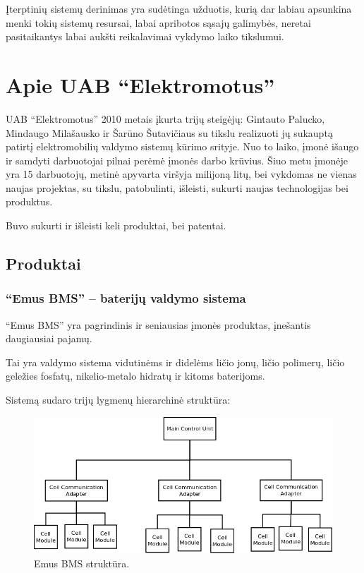 \documentclass[12pt, a4paper, lithuanian, final]{article}
\begin{document}
Įterptinių sistemų derinimas yra sudėtinga užduotis, kurią dar labiau apsunkina menki tokių sistemų resursai, labai apribotos sąsajų galimybės, neretai pasitaikantys labai aukšti reikalavimai vykdymo laiko tikslumui.











\section{Apie UAB "`Elektromotus"'}

UAB "`Elektromotus"' 2010 metais įkurta trijų steigėjų: Gintauto Palucko, Mindaugo Milašausko ir Šarūno Šutavičiaus su tikslu realizuoti jų sukauptą patirtį elektromobilių valdymo sistemų kūrimo srityje.
Nuo to laiko, įmonė išaugo ir samdyti darbuotojai pilnai perėmė įmonės darbo krūvius.
Šiuo metu įmonėje yra 15 darbuotojų, metinė apyvarta viršyja milijoną litų, bei vykdomas ne vienas naujas projektas, su tikslu, patobulinti, išleisti, sukurti naujas technologijas bei produktus.

Buvo sukurti ir išleisti keli produktai, bei patentai.


\subsection{Produktai}
\subsubsection{"`Emus BMS"' -- baterijų valdymo sistema}
"`Emus BMS"' yra pagrindinis ir seniausias įmonės produktas, įnešantis daugiausiai pajamų.

Tai yra valdymo sistema vidutinėms ir didelėms ličio jonų, ličio polimerų, ličio geležies fosfatų, nikelio-metalo hidratų ir kitoms baterijoms.

Sistemą sudaro trijų lygmenų hierarchinė struktūra:

\begin{figure}[H]
\begin{center}
\includegraphics[width=1\textwidth]{img/bms_desc.png}
\caption{Emus BMS struktūra.}
\end{center}
\end{figure}
\end{document}
